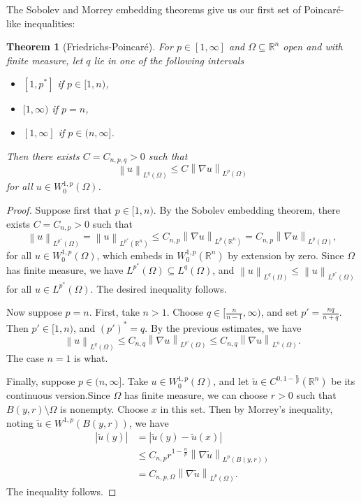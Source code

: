 \documentclass{book}
\newcommand{\bbR}{\mathbb{R}}
\newcommand{\abs}[1]{\left\lvert {#1} \right\rvert}
\newcommand{\norm}[1]{\left\lVert {#1} \right\rVert}
\newtheorem{theorem}{Theorem}[chapter]
\theoremstyle{definition}
\numberwithin{equation}{chapter}
\begin{document}
The Sobolev and Morrey embedding theorems give us our first set of Poincar\'e-like inequalities:
\begin{theorem}[Friedrichs-Poincar\'e]
    For $p \in [1,\infty]$ and $\Omega \subseteq \bbR^n$ open and with finite measure, let $q$ lie in one of the following intervals
    \begin{itemize}
        \item $[1,p^*]$ if $p \in [1,n)$,
        \item $[1,\infty)$ if $p = n$,
        \item $[1,\infty]$ if $p \in (n,\infty]$.
    \end{itemize}
    Then there exists $C = C_{n,p,q} > 0$ such that
    \begin{equation}
        \norm{u}_{L^q(\Omega)} \leq C \norm{\nabla u}_{L^p(\Omega)}
    \end{equation}
    for all $u \in W_0^{1,p}(\Omega)$.
\end{theorem}
\begin{proof}
    Suppose first that $p \in [1,n)$. By the Sobolev embedding theorem, there exists $C = C_{n,p} > 0$ such that 
    \begin{equation}
        \norm{u}_{L^{p^*}(\Omega)} 
        = \norm{u}_{L^{p^*}(\bbR^n)} 
        \leq C_{n,p}\norm{\nabla u}_{L^p(\bbR^n)}
        = C_{n,p} \norm{\nabla u}_{L^p(\Omega)},
    \end{equation}
    for all $u \in W^{1,p}_0(\Omega)$, which embeds in $W^{1,p}_0(\bbR^n)$ by extension by zero. Since $\Omega$ has finite measure, we have $L^{p^*}(\Omega) \subseteq L^q(\Omega)$, and $\norm{u}_{L^q(\Omega)} \leq \norm{u}_{L^{p^*}(\Omega)}$ for all $u \in L^{p^*}(\Omega)$. The desired inequality follows.

    Now suppose $p = n$. First, take $n > 1$. Choose $q \in [\frac{n}{n-1}, \infty)$, and set $p' = \frac{nq}{n+q}$. Then $p' \in [1,n)$, and $(p')^* = q$. By the previous estimates, we have
    \begin{equation}
        \norm{u}_{L^q(\Omega)}
        \leq C_{n,q} \norm{\nabla u}_{L^{p'}(\Omega)}
        \leq C_{n,q} \norm{\nabla u}_{L^n(\Omega)}.
    \end{equation}
    The case $n = 1$ is what.

    Finally, suppose $p \in (n,\infty]$. Take $u \in W_0^{1,p}(\Omega)$, and let $\widetilde{u} \in C^{0,1-\frac{n}{p}}(\bbR^n)$ be its continuous version.Since $\Omega$ has finite measure, we can choose $r > 0$ such that $B(y,r) \setminus \Omega$ is nonempty. Choose $x$ in this set. Then by Morrey's inequality, noting $\widetilde{u} \in W^{1,p}(B(y,r))$, we have 
    \begin{equation} \begin{aligned}
        \abs{\widetilde{u}(y)}
        &= \abs{\widetilde{u}(y) - \widetilde{u}(x)} \\
        &\leq C_{n,p} r^{1 - \frac{n}{p}} \norm{\nabla \widetilde{u}}_{L^p(B(y,r))} \\
        &= C_{n,p,\Omega} \norm{\nabla \widetilde{u}}_{L^p(\Omega)}.
    \end{aligned} \end{equation}
    The inequality follows.
\end{proof}
\end{document}
